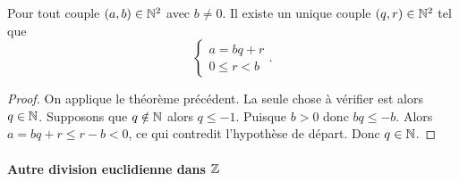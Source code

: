 \begin{theo}
  Pour tout couple $(a,b) \in \mathbb{N}^2$ avec $b \neq 0$. Il existe un unique couple $(q,r) \in \mathbb{N}^2$ tel que
  \begin{equation}
    \begin{cases}
      a=bq+r \\ 0 \leq r < b
    \end{cases}.
  \end{equation}
\end{theo}
\begin{proof}
  On applique le théorème précédent. La seule chose à vérifier est alors $q \in \mathbb{N}$. Supposons que $q \notin \mathbb{N}$ alors $q \leq -1$. Puisque $b>0$ donc $bq \leq -b$. Alors $a=bq+r \leq r-b <0$, ce qui contredit l'hypothèse de départ. Donc $q \in \mathbb{N}$.
\end{proof}

\paragraph{Autre division euclidienne dans $\mathbb{Z}$}

